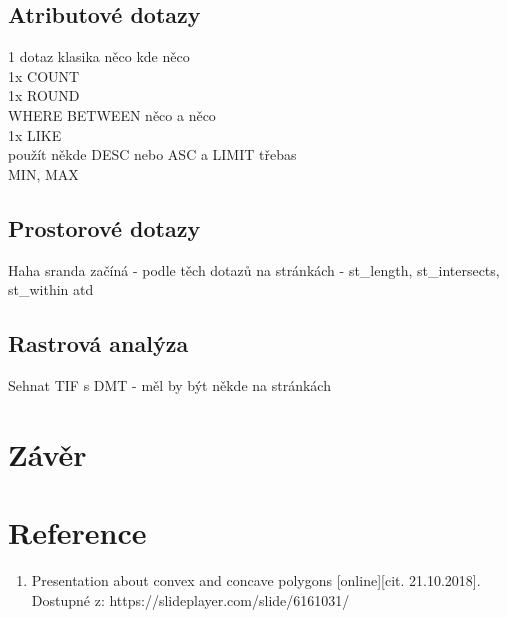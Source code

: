 \documentclass[a4paper, 12pt]{article}
\begin{document}
\subsection{Atributové dotazy}
1 dotaz klasika něco kde něco\\
1x COUNT\\
1x ROUND\\
WHERE BETWEEN něco a něco\\
1x LIKE\\
použít někde DESC nebo ASC  a LIMIT třebas\\
MIN, MAX\\


\subsection{Prostorové dotazy}
Haha sranda začíná - podle těch dotazů na stránkách - st\_length, st\_intersects, st\_within atd


\subsection{Rastrová analýza}
Sehnat TIF s DMT - měl by být někde na stránkách



\section{Závěr}

\clearpage
\section{Reference}

\begin{enumerate}
\item  Presentation about convex and concave polygons [online][cit. 21.10.2018]. \\
Dostupné z: https://slideplayer.com/slide/6161031/  \\


\end{enumerate}
\end{document}
